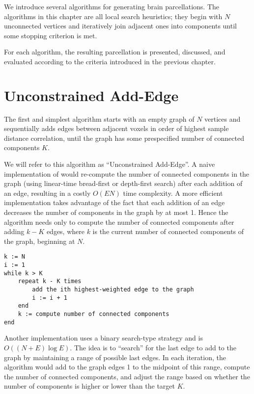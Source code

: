 
We introduce several algorithms for generating brain parcellations. The
algorithms in this chapter are all local search heuristics; they begin
with $N$ unconnected vertices and iteratively join adjacent ones into
components until some stopping criterion is met.

For each algorithm, the resulting parcellation is presented, discussed,
and evaluated according to the criteria introduced in the previous
chapter.

\section{Unconstrained Add-Edge}

The first and simplest algorithm starts with an empty graph of $N$
vertices and sequentially adds edges between adjacent voxels in order of
highest sample distance correlation, until the graph has some
prespecified number of connected components $K$.

We will refer to this algorithm as ``Unconstrained Add-Edge''. A naive
implementation of would re-compute the number of connected components in
the graph (using linear-time bread-first or depth-first search) after
each addition of an edge, resulting in a costly $O(EN)$ time complexity.
A more efficient implementation takes advantage of the fact that each
addition of an edge decreases the number of components in the graph by
at most 1. Hence the algorithm needs only to compute the number of
connected components after adding $k - K$ edges, where $k$ is the
current number of connected components of the graph, beginning at $N$.

\begin{verbatim}
k := N
i := 1
while k > K
    repeat k - K times
        add the ith highest-weighted edge to the graph
        i := i + 1
    end
    k := compute number of connected components
end
\end{verbatim}

Another implementation uses a binary search-type strategy and is
$O((N + E) \log E)$. The idea is to ``search'' for the last edge to add
to the graph by maintaining a range of possible last edges. In each
iteration, the algorithm would add to the graph edges 1 to the midpoint
of this range, compute the number of connected components, and adjust
the range based on whether the number of components is higher or lower
than the target $K$.

